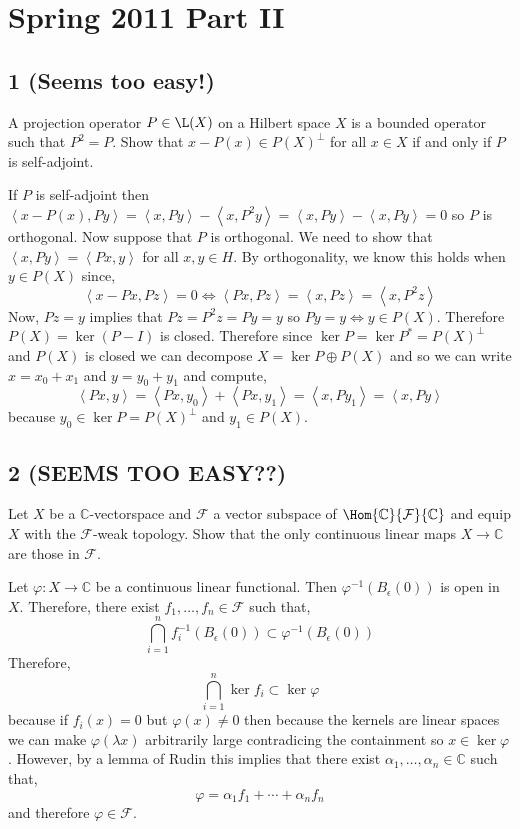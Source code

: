 \documentclass[12pt]{article}
\newcommand{\inner}[2]{\left< #1, #2 \right>}
\renewcommand{\C}{\mathbb{C}}
\renewcommand{\F}{\mathcal{F}}
\begin{document}
\section{Spring 2011 Part II}

\subsection{1 (Seems too easy!)}

\begin{exercise}
A projection operator $P \in \L(X)$ on a Hilbert space $X$ is a bounded operator such that $P^2 = P$. Show that $x - P(x) \in P(X)^\perp$ for all $x \in X$ if and only if $P$ is self-adjoint.
\end{exercise}

If $P$ is self-adjoint then $\inner{x - P(x)}{Py} = \inner{x}{Py} - \inner{x}{P^2 y} = \inner{x}{Py} - \inner{x}{P y} = 0$ so $P$ is orthogonal. Now suppose that $P$ is orthogonal. We need to show that $\inner{x}{P y} = \inner{P x}{y}$ for all $x, y \in H$. By orthogonality, we know this holds when $y \in P(X)$ since,
\[ \inner{x - Px}{Pz} = 0 \iff \inner{P x}{Pz} = \inner{x}{P z} = \inner{x}{P^2 z} \]
Now, $P z = y$ implies that $P z = P^2 z = P y = y$ so $P y = y \iff y \in P(X)$. Therefore $P(X) = \ker{(P - I)}$ is closed.
Therefore since $\ker{P} = \ker{P^*} = P(X)^\perp$ and $P(X)$ is closed we can decompose $X = \ker{P} \oplus P(X)$ and so we can write $x = x_0 + x_1$ and $y = y_0 + y_1$ and compute,
\[ \inner{P x}{y} = \inner{Px}{y_0} + \inner{P x}{y_1} = \inner{x}{P y_1} = \inner{x}{P y} \]
because $y_0 \in \ker{P} = P(X)^\perp$ and $y_1 \in P(X)$.

\subsection{2 (SEEMS TOO EASY??)}

\begin{exercise}
Let $X$ be a $\C$-vectorspace and $\F$ a vector subspace of $\Hom{\C}{\F}{\C}$ and equip $X$ with the $\F$-weak topology. Show that the only continuous linear maps $X \to \C$ are those in $\F$.
\end{exercise}

Let $\varphi : X \to \C$ be a continuous linear functional. Then $\varphi^{-1}(B_\epsilon(0))$ is open in $X$. Therefore, there exist $f_1, \dots, f_n \in \F$ such that,
\[ \bigcap_{i = 1}^n f_i^{-1}(B_\epsilon(0)) \subset \varphi^{-1}(B_\epsilon(0)) \]
Therefore,
\[ \bigcap_{i = 1}^n \ker{f_i} \subset \ker{\varphi} \]
because if $f_i(x) = 0$ but $\varphi(x) \neq 0$ then because the kernels are linear spaces we can make $\varphi(\lambda x)$ arbitrarily large contradicing the containment so $x \in \ker{\varphi}$. However, by a lemma of Rudin this implies that there exist $\alpha_1, \dots, \alpha_n \in \C$ such that,
\[ \varphi = \alpha_1 f_1 + \cdots + \alpha_n f_n \]
and therefore $\varphi \in \F$.
\end{document}
